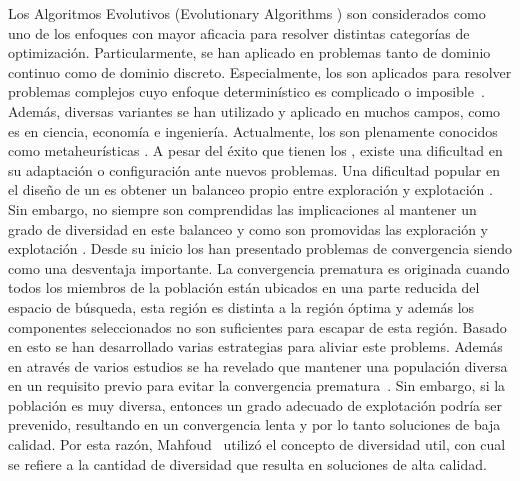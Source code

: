 Los Algoritmos Evolutivos (Evolutionary Algorithms \EA{}) son considerados como uno de los enfoques con mayor aficacia para resolver distintas categorías de optimización.
%
Particularmente, se han aplicado en problemas tanto de dominio continuo \cite{glover2005handbook} como de dominio discreto.
%
Especialmente, los \EAS{} son aplicados para resolver problemas complejos cuyo enfoque determinístico es complicado o imposible~\cite{chakraborty2008advances}.
% 
Además, diversas variantes se han utilizado y aplicado en muchos campos, como es en ciencia, economía e ingeniería.
%
%
Actualmente, los \EAS{} son plenamente conocidos como metaheurísticas \cite{glover2005handbook}.
%
A pesar del éxito que tienen los \EAS{}, existe una dificultad en su adaptación o configuración ante nuevos problemas.
%
Una dificultad popular en el diseño de un \EA{} es obtener un balanceo propio entre exploración y explotación \cite{herrera1996adaptation}.
%
Sin embargo, no siempre son comprendidas las implicaciones al mantener un grado de diversidad en este balanceo y como son promovidas las exploración y explotación \cite{Crepinsek:13}.
%
Desde su inicio los \EAS{} han presentado problemas de convergencia siendo como una desventaja importante\cite{Crepinsek:13}.
%
La convergencia prematura es originada cuando todos los miembros de la población están ubicados en una parte reducida del espacio de búsqueda, esta región es distinta a la región óptima y además los componentes seleccionados no son suficientes para escapar de esta región.
%
Basado en esto se han desarrollado varias estrategias para aliviar este problems.
%
Además en através de varios estudios se ha revelado que mantener una populación diversa en un requisito previo para evitar la convergencia prematura~\cite{Crepinsek:13}.
%
Sin embargo, si la población es muy diversa, entonces un grado adecuado de explotación podría ser prevenido, resultando en un convergencia lenta y por lo tanto soluciones de baja calidad.
%
Por esta razón, Mahfoud~\cite{dasgupta2013evolutionary} utilizó el concepto de diversidad util, con cual se refiere a la cantidad de diversidad que resulta en soluciones de alta calidad.
%

